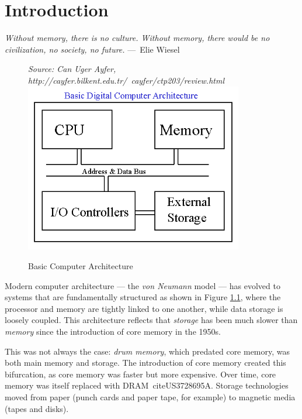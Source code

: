 
\chapter{Introduction}
\label{ch:Introduction}


\begin{epigraph}
    \emph{Without memory, there is no culture. Without memory, there 
    would be no civilization, no society, no future.} ---~Elie Wiesel
\end{epigraph}


\begin{figure}
\centering
\caption{Basic Computer Architecture}\label{figure:computer_architecture}
\emph{Source: Can Uger Ayfer, http://cayfer.bilkent.edu.tr/~cayfer/ctp203/review.html}
\includegraphics[width=0.85\textwidth]{figures/computer-architecture.png}
\end{figure}


Modern computer architecture --- the \textit{von Neumann} model --- has
evolved to systems that are fundamentally structured  as shown in Figure \ref{figure:computer_architecture},
where the processor and memory are tightly linked to one another, while
data storage is loosely coupled.  This architecture reflects that \emph{storage}
has been much slower than \emph{memory} since the introduction of core memory in
the 1950s.

This was not always the case: \emph{drum memory}, which predated core memory,
was both main memory and storage.  The introduction of core memory created
this bifurcation, as core memory was faster but more expensive.  Over time, core
memory was itself replaced with \acs{DRAM}~cite{US3728695A}.  Storage technologies
moved from paper (punch cards and paper tape, for example) to magnetic media 
(tapes and disks).

